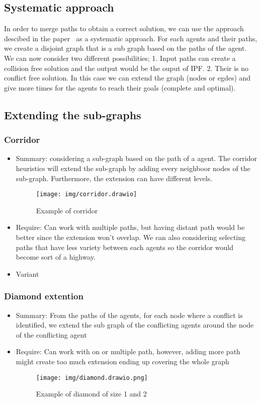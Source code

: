 \documentclass{article}
\theoremstyle{definition}
\newcommand\widthimg{11cm}
\begin{document}
\subsection{Systematic approach}
In order to merge paths to obtain a correct solution, we can use the approach descibed in the paper~\cite{ji22a} as a systematic approach. For each agents and their paths, we create a disjoint graph that is a sub graph based on the paths of the agent. We can now consider two different possibilities; 1. Input paths can create a collision free solution and the output would be the ouput of IPF\@. 2. Their is no conflict free solution. In this case we can extend the graph (nodes or egdes) and give more times for the agents to reach their goals (complete and optimal).



\subsection{Extending the sub-graphs}


\subsubsection{Corridor}
\begin{itemize}
  \item Summary: considering a sub-graph based on the path of a agent. The corridor heuristics will extend the sub-graph by adding every neighboor nodes of the sub-graph. Furthermore, the extension can have different levels.
  \begin{figure}[H]\label{img:corridor}
    \centering
    \caption{Example of corridor}
    \texttt{[image: img/corridor.drawio]}
  \end{figure}

  \item Require: Can work with multiple paths, but having distant path would be better since the extension won't overlap. We can also considering selecting paths that have less variety between each agents so the corridor would become sort of a highway. 
  \item Variant 
\end{itemize}

\subsubsection{Diamond extention}
\begin{itemize}
  \item Summary: From the paths of the agents, for each node where a conflict is identified, we extend the sub graph of the conflicting agents around the node of the conflicting agent
  \item Require: Can work with on or multiple path, however, adding more path might create too much extension ending up covering the whole graph 
  \begin{figure}[H]\label{img:diamond}
    \centering
    \caption{Example of diamond of size 1 and 2}
    \texttt{[image: img/diamond.drawio.png]}
  \end{figure}
\end{itemize}
\end{document}
